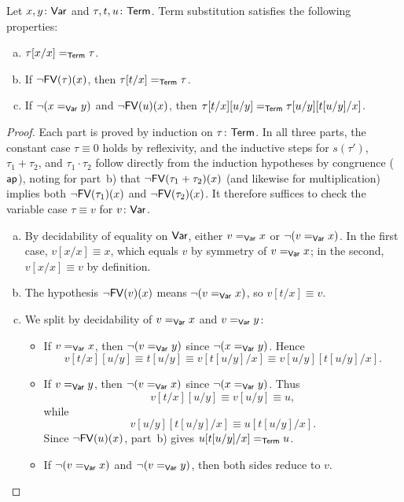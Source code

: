 \begin{lem}\label{lem:term-substitution}
    Let\/ $x,y\colon\fun{Var}$ and\/ $\tau,t,u\colon\fun{Term}$. Term substitution satisfies the following properties:
    \begin{enumerate}[a),font=\upshape]
        \item $\tau[x/x]\mathrel{=_{\mathsf{Term}}}\tau$.

        \item If\/ $\neg\mathsf{FV}(\tau)(x)$, then\/ $\tau[t/x]\mathrel{=_{\mathsf{Term}}}\tau$.

        \item If\/ $\neg(x\mathrel{=_{\mathsf{Var}}}y)$ and\/ $\neg\mathsf{FV}(u)(x)$, then\/ $\tau[t/x][u/y]\mathrel{=_{\mathsf{Term}}}\tau[u/y][t[u/y]/x]$.
    \end{enumerate}
\end{lem}

\begin{proof}
    Each part is proved by induction on $\tau\colon\fun{Term}$. In all three parts, the constant case $\tau\equiv 0$ holds by reflexivity, and the inductive steps for $s(\tau')$, $\tau_1+\tau_2$, and $\tau_1\cdot \tau_2$ follow directly from the induction hypotheses by congruence ($\mathsf{ap}$), noting for part~b) that $\neg\mathsf{FV}(\tau_1+\tau_2)(x)$ (and likewise for multiplication) implies both $\neg\mathsf{FV}(\tau_1)(x)$ and $\neg\mathsf{FV}(\tau_2)(x)$. It therefore suffices to check the variable case $\tau\equiv v$ for $v\colon\fun{Var}$.
    \begin{enumerate}[a),font=\upshape]
        \item By decidability of equality on $\mathsf{Var}$, either $v\mathrel{=_{\mathsf{Var}}}x$ or $\neg(v\mathrel{=_{\mathsf{Var}}}x)$. In the first case, $v[x/x]\equiv x$, which equals $v$ by symmetry of $v\mathrel{=_{\mathsf{Var}}}x$; in the second, $v[x/x]\equiv v$ by definition.

        \item The hypothesis $\neg\mathsf{FV}(v)(x)$ means $\neg(v\mathrel{=_{\mathsf{Var}}}x)$, so $v[t/x]\equiv v$.

        \item We split by decidability of $v\mathrel{=_{\mathsf{Var}}}x$ and $v\mathrel{=_{\mathsf{Var}}}y$:
        \begin{itemize}
            \item If $v\mathrel{=_{\mathsf{Var}}}x$, then $\neg(v\mathrel{=_{\mathsf{Var}}}y)$ since $\neg(x\mathrel{=_{\mathsf{Var}}}y)$. Hence
            \[
                v[t/x][u/y]\equiv t[u/y]\equiv v[t[u/y]/x]\equiv v[u/y][t[u/y]/x].
            \]
            \item If $v\mathrel{=_{\mathsf{Var}}}y$, then $\neg(v\mathrel{=_{\mathsf{Var}}}x)$ since $\neg(x\mathrel{=_{\mathsf{Var}}}y)$. Thus
            \[
                v[t/x][u/y]\equiv v[u/y]\equiv u,
            \]
            while
            \[
                v[u/y][t[u/y]/x]\equiv u[t[u/y]/x].
            \]
            Since $\neg\mathsf{FV}(u)(x)$, part~b) gives $u[t[u/y]/x]\mathrel{=_{\mathsf{Term}}}u$.
            \item If $\neg(v\mathrel{=_{\mathsf{Var}}}x)$ and $\neg(v\mathrel{=_{\mathsf{Var}}}y)$, then both sides reduce to $v$.
        \end{itemize}
    \end{enumerate}
\end{proof}

